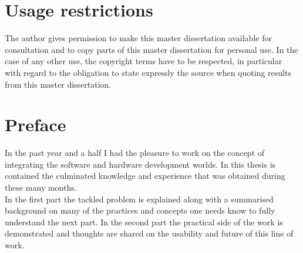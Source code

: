 \documentclass[11pt,british]{article}
\begin{document}

\newpage{}
\part*{Usage restrictions}

The author gives permission to make this master dissertation available for consultation 
and to copy parts of this master dissertation for personal use. 
 In the case of any other use, the copyright terms have to be respected, in particular with regard to 
the obligation to state expressly the source when quoting results from this master dissertation.

\pagebreak{}


\newpage{}\part*{Preface}
In the past year and a half I had the pleasure to work on the concept of integrating the software and hardware development worlds. In this thesis is contained the culminated knowledge and experience that was obtained during these many months.
\\[\baselineskip]
In the first part the tackled problem is explained along with a summarised background on many of the practices and concepts one needs know to fully understand the next part. In the second part the practical side of the work is demonstrated and thoughts are shared on the usability and future of this line of work.
\\[\baselineskip]
\end{document}
